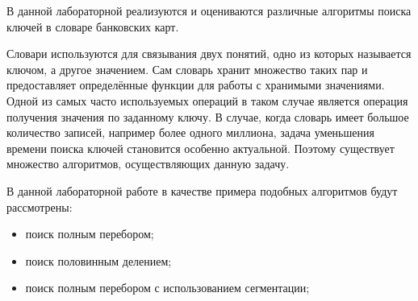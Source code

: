 В данной лабораторной реализуются и оцениваются различные алгоритмы поиска ключей в словаре банковских карт.

Словари используются для связывания двух понятий, одно из которых называется ключом, а другое значением. Сам словарь хранит множество таких пар и предоставляет определённые функции для работы с хранимыми значениями. Одной из самых часто используемых операций в таком случае является операция получения значения по заданному ключу. В случае, когда словарь имеет большое количество записей, например более одного миллиона, задача уменьшения времени поиска ключей становится особенно актуальной. Поэтому существует множество алгоритмов, осуществляющих данную задачу.

В данной лабораторной работе в качестве примера подобных алгоритмов будут рассмотрены:
\begin{itemize}
	\item поиск полным перебором;
	\item поиск половинным делением;
	\item поиск полным перебором с использованием сегментации;
\end{itemize}

